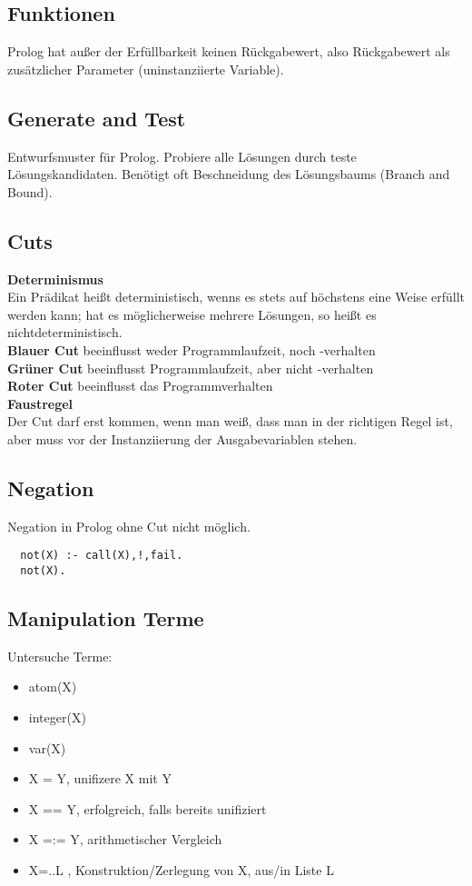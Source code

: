 \subsection{Funktionen}%
\label{lp:sub:funktionen}
Prolog hat außer der Erfüllbarkeit keinen Rückgabewert, also Rückgabewert als zusätzlicher Parameter (uninstanziierte Variable).

\subsection{Generate and Test}%
\label{lp:sub:generate-and-test}
Entwurfsmuster für Prolog. Probiere alle Lösungen durch teste Lösungskandidaten. Benötigt oft Beschneidung des
Lösungsbaums (Branch and Bound).

\subsection{Cuts}%
\label{lp:sub:cuts}
\textbf{Determinismus}\\
Ein Prädikat heißt deterministisch, wenns es stets auf höchstens eine Weise erfüllt werden kann; hat es
möglicherweise mehrere Lösungen, so heißt es nichtdeterministisch.\\

\textbf{Blauer Cut} beeinflusst weder Programmlaufzeit, noch -verhalten\\
\textbf{Grüner Cut} beeinflusst Programmlaufzeit, aber nicht -verhalten\\
\textbf{Roter Cut} beeinflusst das Programmverhalten\\

\textbf{Faustregel}\\
Der Cut darf erst kommen, wenn man weiß, dass man in der richtigen Regel ist, aber muss vor der
Instanziierung der Ausgabevariablen stehen.

\subsection{Negation}%
\label{lp:sub:negation}
Negation in Prolog ohne Cut nicht möglich.
\begin{lstlisting}
  not(X) :- call(X),!,fail.
  not(X).
\end{lstlisting}

\subsection{Manipulation Terme}%
\label{lp:sub:manipulation-terme}
Untersuche Terme:
\begin{itemize}
  \item atom(X)
  \item integer(X)
  \item var(X)
  \item X = Y, unifizere X mit Y
  \item X == Y, erfolgreich, falls bereits unifiziert
  \item X =:= Y, arithmetischer Vergleich
  \item X=..L , Konstruktion/Zerlegung von X, aus/in Liste L
\end{itemize}

